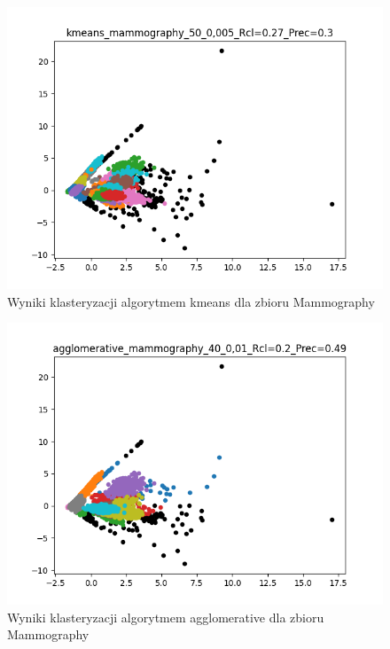 \documentclass{classrep}
\begin{document}
{{            \begin{figure}[!htbp]
                \centering
                \includegraphics[width=\textwidth]{img/kmeans_mammography_50_0,005_-115816.png}
                \caption
                {Wyniki klasteryzacji algorytmem kmeans dla zbioru Mammography}
                \label{fig:mammo_kmeans}
            \end{figure}

            \begin{figure}[!htbp]
                \centering
                \includegraphics[width=\textwidth]{img/agglomerative_mammography_40_0,01_-115822.png}
                \caption
                {Wyniki klasteryzacji algorytmem agglomerative dla zbioru Mammography}
                \label{fig:mammo_agglomerative}
            \end{figure}

}}
\end{document}
